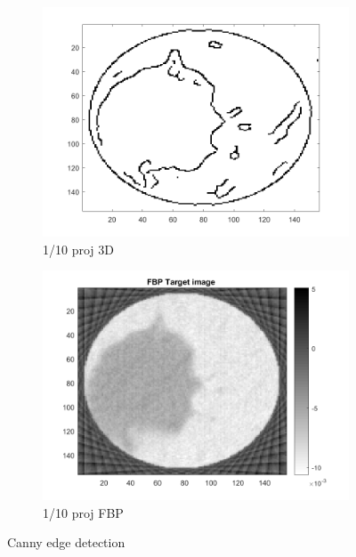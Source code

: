 \begin{figure}[ht!]
\begin{subfigure}[b]{0.24\textwidth}
            	\centering 
            	\includegraphics[width=\textwidth]{../../data/res/SB_Reconstruction/Edges/3D/it250_proj1_10.png}
            	\caption{1/10 proj 3D}    
            	\label{subfig:FBP1156p}
        	\end{subfigure}
        	\begin{subfigure}[b]{0.24\textwidth}  
            	\centering 
            	\includegraphics[width=\textwidth]{../../data/res/FBP/Target1/FBP_1_10_001_noise.png}
            	\caption{1/10 proj FBP}    
            	\label{subfig:FBP1156p}
        	\end{subfigure}
        	\caption{Canny edge detection}
        	\label{fig:Canny}
    	\end{figure}


